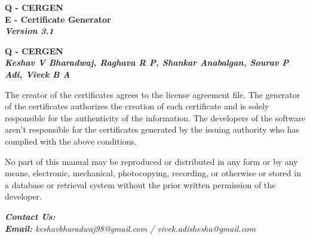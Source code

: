 

\begin{titlingpage}
	
\vspace{2cm}

\centering
{
	\Large{
		\textbf{Q - CERGEN}\\
		\textbf{E - Certificate Generator}\\
		\textbf{\textit{Version 3.1}}}
	\vspace{2cm}
	
	\Large\textbf{Q - CERGEN}\\
	\vspace{0.5cm}
	\large\textbf{\textit{Keshav V Bharadwaj, Raghava R P, Shankar Anabalgan, Sourav P Adi, Vivek B A}}
	\vspace{2.5cm}
}


The creator of the certificates agrees to the license agreement file. The generator of the certificates authorizes the creation of each certificate and is solely responsible for the authenticity of the information. The developers of the software aren't responsible for the certificates generated by the issuing authority who has complied with the above conditions.

\vspace{2cm}

No part of this manual may be reproduced or distributed in any form or by any means, electronic, mechanical, photocopying, recording, or otherwise or stored in a database or retrieval system without the prior written permission of the developer.

\vspace{0.5cm}

\begin{flushleft}
	\large\textit{\textbf{Contact Us:}}\\
	\textit{\textbf{Email:} keshavbharadwaj98@gmail.com / vivek.adishesha@gmail.com}\\
\end{flushleft}
	
	
	
	
\end{titlingpage}



